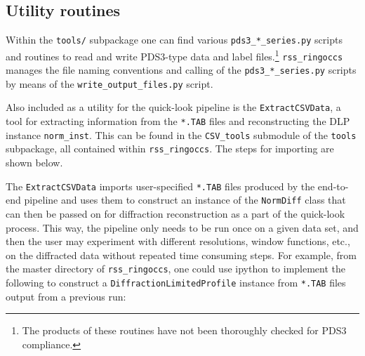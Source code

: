 \documentclass[titlepage, 12pt]{article}
\begin{document}
        \subsection{Utility routines}
            Within the \texttt{tools/} subpackage one can find various
            \texttt{pds3\_*\_series.py} scripts and routines
            to read and write PDS3-type data and label files.\footnote{The
            products of these routines have not been thoroughly checked
            for PDS3 compliance.} \texttt{rss\_ringoccs} manages the file
            naming conventions and calling of the
            \texttt{pds3\_*\_series.py} scripts by means of the
            \texttt{write\_output\_files.py} script.
            \par\hfill\par
            Also included as a utility for the quick-look pipeline 
            is the \texttt{ExtractCSVData}, a tool for 
            extracting information from the \texttt{*.TAB} files and 
            reconstructing the DLP instance \texttt{norm\_inst}.
            This can be found in the \texttt{CSV\_tools}
            submodule of the \texttt{tools} subpackage,
            all contained within \texttt{rss\_ringoccs}.
            The steps for importing are shown below.
            \par\hfill\par
            The \texttt{ExtractCSVData} imports user-specified 
            \texttt{*.TAB} files produced by the end-to-end pipeline
            and uses them to construct an instance of the
            \texttt{NormDiff} 
            class that can then be passed on for
            diffraction reconstruction
            as a part of the quick-look process.
            This way, the pipeline only needs to be run once on
            a given data set, and then the user may experiment
            with different resolutions, window functions, etc.,
            on the diffracted data without repeated time
            consuming steps. For example, from the
            master directory of \texttt{rss\_ringoccs}, one could use
            ipython to implement the following to construct a
            \texttt{DiffractionLimitedProfile} instance from \texttt{*.TAB}
            files output from a previous run:
            \clearpage
\end{document}
